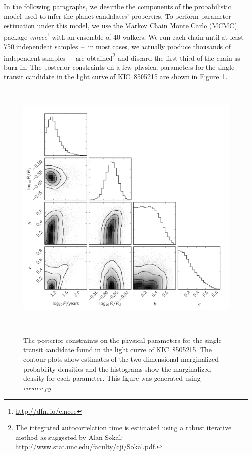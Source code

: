 \documentclass[manuscript, letterpaper]{aastex6}
\newcommand{\project}[1]{\textsl{#1}}
\newcommand{\emcee}{\project{emcee}}
\newcommand{\dfmfigref}[1]{\ref{fig:#1}}
\newcommand{\dfmFig}[1]{Figure~\dfmfigref{#1}}
\newcommand{\dfmfig}[1]{\dfmFig{#1}}
\newcommand{\dfmfiglabel}[1]{\label{fig:#1}}
\begin{document}
In the following paragraphs, we describe the components of the probabilistic
model used to infer the planet candidates' properties.
To perform parameter estimation under this model, we use the Markov Chain
Monte Carlo (MCMC) package \emcee\footnote{\url{http://dfm.io/emcee}}
\citep{Foreman-Mackey:2013} with an ensemble of 40 walkers.
We run each chain until at least 750 independent samples~--~in most cases, we
actually produce thousands of independent samples~--~are obtained\footnote{The
integrated autocorrelation time is estimated using a robust iterative method
as suggested by Alan Sokal:
\url{http://www.stat.unc.edu/faculty/cji/Sokal.pdf}.} and discard the first
third of the chain as burn-in.
The posterior constraints on a few physical parameters for the single transit
candidate in the light curve of KIC~8505215 are shown in \dfmfig{corner}.

\begin{figure}~\\
\begin{center}
\includegraphics[width=\textwidth]{figures/params/8505215.pdf}
\end{center}
\caption{%
The posterior constraints on the physical parameters for the single transit
candidate found in the light curve of KIC~8505215.
The contour plots show estimates of the two-dimensional marginalized
probability densities and the histograms show the marginalized density for
each parameter.
This figure was generated using \project{corner.py}
\citep{Foreman-Mackey:2016}.
\dfmfiglabel{corner}}~\\
\end{figure}
\end{document}
